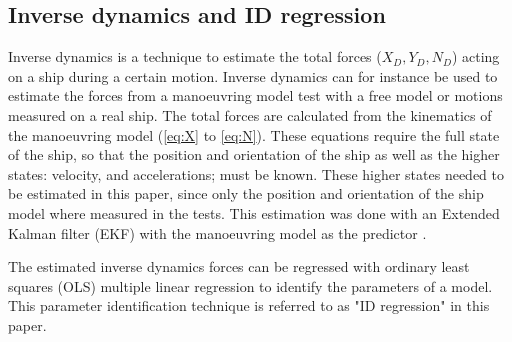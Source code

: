 \subsection{Inverse dynamics and ID regression}
\label{sec:inverse_dynamics}
Inverse dynamics is a technique to estimate the total forces ($X_D,Y_D,N_D$) acting on a ship during a certain motion. Inverse dynamics can for instance be used to estimate the forces from a manoeuvring model test with a free model or motions measured on a real ship. The total forces are calculated from the kinematics of the manoeuvring model (\autoref{eq:X} to \autoref{eq:N}). These equations require the full state of the ship, so that the position and orientation of the ship as well as the higher states: velocity, and accelerations; must be known. 
These higher states needed to be estimated in this paper, since only the position and orientation of the ship model where measured in the tests. This estimation was done with an Extended Kalman filter (EKF) with the manoeuvring model as the predictor \citep{alexandersson_wpcc_2022}.

The estimated inverse dynamics forces can be regressed with ordinary least squares (OLS) multiple
linear regression to identify the parameters of a model. This parameter identification technique is referred to as "ID regression" in this paper.